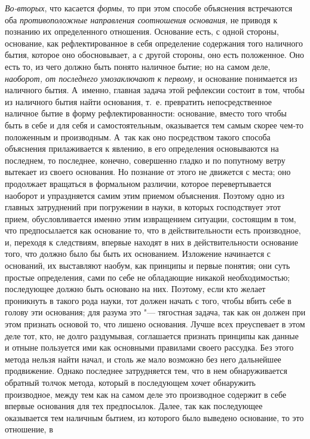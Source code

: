 {\em Во-вторых}, что касается {\em формы}, то при этом способе объяснения
встречаются оба {\em противоположные направления соотношения основания}, не
приводя к познанию их определенного отношения. Основание есть, с одной стороны,
основание, как рефлектированное в себя определение содержания того наличного
бытия, которое оно обосновывает, а с другой стороны, оно есть положенное. Оно
есть то, из чего должно быть понято наличное бытие; но на самом деле,
{\em наоборот, от последнего умозаключают к первому}, и основание понимается из
наличного бытия. А~именно, главная задача этой рефлексии состоит в том, чтобы
из наличного бытия найти основания, т.~е. превратить непосредственное наличное
бытие в форму рефлектированности: основание, вместо того чтобы быть в себе и
для себя и самостоятельным, оказывается тем самым скорее чем-то положенным и
производным. А~так как оно посредством такого способа объяснения прилаживается
к явлению, в его определения основываются на последнем, то последнее, конечно,
совершенно гладко и по попутному ветру вытекает из своего основания. Но
познание от этого не движется с места; оно продолжает вращаться в формальном
различии, которое перевертывается наоборот и упраздняется самим этим приемом
объяснения. Поэтому одно из главных затруднений при погружении в науки, в
которых господствует этот прием, обусловливается именно этим извращением
ситуации, состоящим в том, что предпосылается как основание то, что в
действительности есть производное, и, переходя к следствиям, впервые находят в
них в действительности основание того, что должно было бы быть их основанием.
Изложение начинается с оснований, их выставляют наобум, как принципы и первые
понятия; они суть простые определения, сами по себе не обладающие никакой
необходимостью; последующее должно быть основано на них. Поэтому, если кто
желает проникнуть в такого рода науки, тот должен начать с того, чтобы вбить
себе в голову эти основания; для разума это "--- тягостная задача, так как он
должен при этом признать основой то, что лишено основания. Лучше всех
преуспевает в этом деле тот, кто, не долго раздумывая, соглашается признать
принципы как данные и отныне пользуется ими как основными правилами своего
рассудка. Без этого метода нельзя найти начал, и столь же мало возможно без
него дальнейшее продвижение. Однако последнее затрудняется тем, что в нем
обнаруживается обратный толчок метода, который в последующем хочет обнаружить
производное, между тем как на самом деле это производное содержит в себе
впервые основания для тех предпосылок. Далее, так как последующее оказывается
тем наличным бытием, из которого было выведено основание, то это отношение, в
